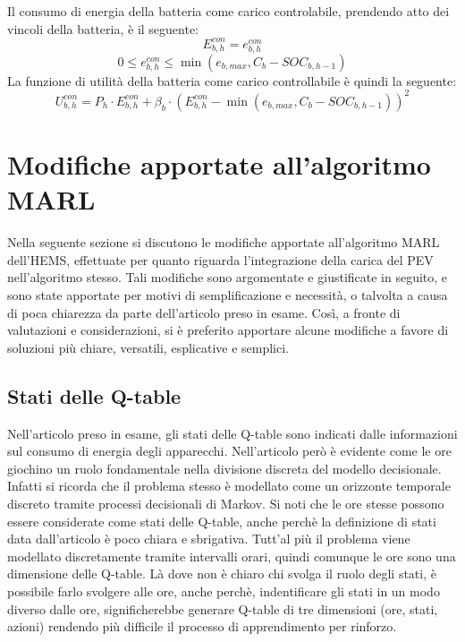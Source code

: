 \documentclass[italian, Lau, oneside]{sapthesis}
\begin{document}
Il consumo di energia della batteria come carico controlabile, prendendo atto dei vincoli della batteria, è il seguente:
\begin{equation}
E^{con}_{b,h} = e^{con}_{b,h}
\end{equation}
\begin{equation}
0 \leq e^{con}_{b,h} \leq \min(e_{b,max}, C_b - SOC_{b,h-1})
\end{equation}
La funzione di utilità della batteria come carico controllabile è quindi la seguente:
\begin{equation}
    U^{con}_{b,h} = P_h \cdot E^{con}_{b,h} + \beta_b \cdot (E^{con}_{b,h} - \min(e_{b,max}, C_b - SOC_{b,h-1}))^2
\end{equation}
\section{Modifiche apportate all'algoritmo MARL}
Nella seguente sezione si discutono le modifiche apportate all'algoritmo MARL dell'HEMS, effettuate per quanto riguarda l'integrazione della carica del PEV nell'algoritmo stesso. Tali modifiche sono argomentate e giustificate in seguito, e sono state apportate per motivi di semplificazione e necessità, o talvolta a causa di poca chiarezza da parte dell'articolo preso in esame. Così, a fronte di valutazioni e considerazioni, si è preferito apportare alcune modifiche a favore di soluzioni più chiare, versatili, esplicative e semplici.




\subsection{Stati delle Q-table}
\label{sec:stati}
Nell'articolo preso in esame, gli stati delle Q-table sono indicati dalle informazioni sul consumo di energia degli apparecchi. Nell'articolo però è evidente come le ore giochino un ruolo fondamentale nella divisione discreta del modello decisionale. Infatti si ricorda che il problema stesso è modellato come un orizzonte temporale discreto tramite processi decisionali di Markov. Si noti che le ore stesse possono essere considerate come stati delle Q-table, anche perchè la definizione di stati data dall'articolo è poco chiara e sbrigativa. Tutt'al più il problema viene modellato discretamente tramite intervalli orari, quindi comunque le ore sono una dimensione delle Q-table. Là dove non è chiaro chi svolga il ruolo degli stati, è possibile farlo svolgere alle ore, anche perchè, indentificare gli stati in un modo diverso dalle ore, significherebbe generare Q-table di tre dimensioni (ore, stati, azioni) rendendo più difficile il processo di apprendimento per rinforzo.
\end{document}
